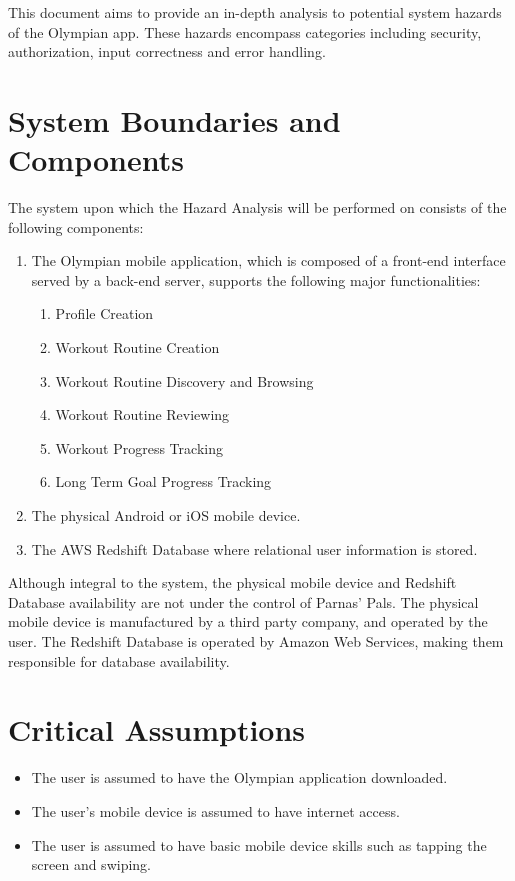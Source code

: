 \documentclass{article}
\begin{document}
	This document aims to provide an in-depth analysis to potential system hazards of the
	Olympian app. These hazards encompass categories including security, authorization,
	input correctness and error handling.

	\section{System Boundaries and Components}

	The system upon which the Hazard Analysis will be performed on consists of the following components:

	\begin{enumerate}
		\item The Olympian mobile application, which is composed of a front-end interface served by a back-end server, supports the following major functionalities: 
		\begin{enumerate}
			\item Profile Creation
			\item Workout Routine Creation
			\item Workout Routine Discovery and Browsing
			\item Workout Routine Reviewing
			\item Workout Progress Tracking
			\item Long Term Goal Progress Tracking
		\end{enumerate}

		\item The physical Android or iOS mobile device.

		\item The AWS Redshift Database where relational user information is stored.

	\end{enumerate}
	Although integral to the system, the physical mobile device and Redshift Database availability are not under the control of Parnas' Pals.
    The physical mobile device is manufactured by a third party company, and operated by the user. 
	The Redshift Database is operated by Amazon Web Services, making them responsible for database availability.
	
	\section{Critical Assumptions}

	\begin{itemize}

	\item The user is assumed to have the Olympian application downloaded.

	\item The user's mobile device is assumed to have internet access.

	\item The user is assumed to have basic mobile device skills such as tapping the screen and swiping.
		
	\end{itemize}
\end{document}
